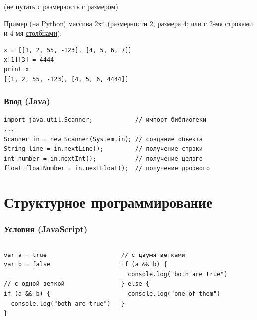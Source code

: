 {\begin{frame}[fragile]
  (не путать с \underline{размерность} с \underline{размером})

  \vspace{0.5cm}
  Пример (на Python) массива 2x4 (размерности 2, размера 4; или с 2-мя \underline{строками} и 4-мя \underline{столбцами}):
  \begin{verbatim}
x = [[1, 2, 55, -123], [4, 5, 6, 7]]
x[1][3] = 4444
print x
[[1, 2, 55, -123], [4, 5, 6, 4444]]
  \end{verbatim}
\end{frame}

\begin{frame}[fragile]
  \frametitle{Ввод (Java)}
  \begin{verbatim}
import java.util.Scanner;            // импорт библиотеки
...
Scanner in = new Scanner(System.in); // создание объекта
String line = in.nextLine();         // получение строки
int number = in.nextInt();           // получение целого
float floatNumber = in.nextFloat();  // получение дробного
  \end{verbatim}
\end{frame}



\section{Структурное программирование}
\begin{frame}[fragile]
\frametitle{Условия (JavaScript)}
\begin{columns}
    \begin{verbatim}
var a = true
var b = false

// с одной веткой
if (a && b) {
  console.log("both are true")
}
    \end{verbatim}
    \begin{verbatim}
// с двумя ветками
if (a && b) {
  console.log("both are true")
} else {
  console.log("one of them")
}
    \end{verbatim}
  \end{columns}
\end{frame}

}
